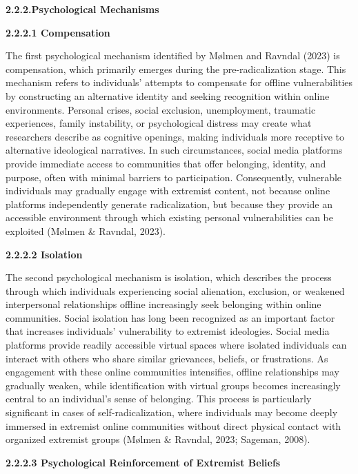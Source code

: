 \documentclass[11pt,a4paper]{article}
\begin{document}
	\textbf{2.2.2.Psychological Mechanisms}
	
	\textbf{ 2.2.2.1 Compensation}
	
	The first psychological mechanism identified by Mølmen and Ravndal (2023) is compensation, which primarily emerges during the pre-radicalization stage. This mechanism refers to individuals' attempts to compensate for offline vulnerabilities by constructing an alternative identity and seeking recognition within online environments. Personal crises, social exclusion, unemployment, traumatic experiences, family instability, or psychological distress may create what researchers describe as cognitive openings, making individuals more receptive to alternative ideological narratives. In such circumstances, social media platforms provide immediate access to communities that offer belonging, identity, and purpose, often with minimal barriers to participation. Consequently, vulnerable individuals may gradually engage with extremist content, not because online platforms independently generate radicalization, but because they provide an accessible environment through which existing personal vulnerabilities can be exploited (Mølmen \& Ravndal, 2023).
	
	\textbf{2.2.2.2 Isolation}
	
	The second psychological mechanism is isolation, which describes the process through which individuals experiencing social alienation, exclusion, or weakened interpersonal relationships offline increasingly seek belonging within online communities. Social isolation has long been recognized as an important factor that increases individuals' vulnerability to extremist ideologies. Social media platforms provide readily accessible virtual spaces where isolated individuals can interact with others who share similar grievances, beliefs, or frustrations. As engagement with these online communities intensifies, offline relationships may gradually weaken, while identification with virtual groups becomes increasingly central to an individual's sense of belonging. This process is particularly significant in cases of self-radicalization, where individuals may become deeply immersed in extremist online communities without direct physical contact with organized extremist groups (Mølmen \& Ravndal, 2023; Sageman, 2008).
	
	\textbf{2.2.2.3 Psychological Reinforcement of Extremist Beliefs}
	
\end{document}
